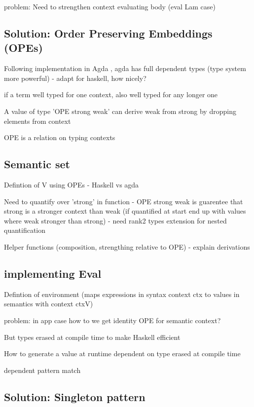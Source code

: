 problem: Need to strengthen context evaluating body (eval Lam case)
\subsection{Solution: Order Preserving Embeddings (OPEs)}

Following implementation in Agda \cite{AgdaNbe}, agda has full dependent types (type system more powerful) - adapt for haskell, how nicely? 

if a term well typed for one context, also well typed for any longer one

A value of type 'OPE strong weak' can derive weak from strong by dropping elements from context

OPE is a relation on typing contexts

\subsection{Semantic set}

Defintion of V using OPEs - Haskell vs agda

Need to quantify over 'strong' in function - OPE strong weak is guarentee that strong is a stronger context than weak (if quantified at start end up with values where weak stronger than strong) - need rank2 types extension for nested quantification

Helper functions (composition, strengthing relative to OPE) - explain derivations

\subsection{implementing Eval}

Defintion of environment (maps expressions in syntax context ctx to values in semantics with context ctxV)

problem: in app case how to we get identity OPE for semantic context?

But types erased at compile time to make Haskell efficient

How to generate a value at runtime dependent on type erased at compile time

dependent pattern match \cite{SingletonsGuide}

\subsection{Solution: Singleton pattern}

